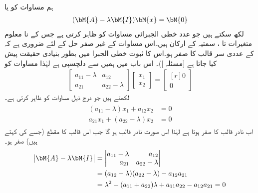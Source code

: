 ہم مساوات  کو  یا 
\begin{align}\label{مساوات_نظام_امتیازی_ب}
(\bM{A}-\lambda \bM{I})\bM{x}=\bM{0}
\end{align}
لکھ سکتے ہیں جو  عدد خطی الجبرائی مساوات کو ظاہر کرتی ہے جس کے نا معلوم متغیرات  تا ، سمتیہ  کے ارکان ہیں۔اس مساوات کے غیر صفر حل  کے لئے ضروری ہے کہ  کے عددی سر قالب کا  صفر ہو۔اس کا ثبوت  خطی الجبرا میں بطور بنیادی حقیقت پیش کیا جاتا ہے [مسئلہ ])۔ اس باب میں ہمیں   سے دلچسپی ہے لہٰذا مساوات  کو
\begin{align}\label{مساوات_نظام_امتیازی_پ}
\begin{bmatrix*}
a_{11}-\lambda& a_{12}\\
a_{21}& a_{22}-\lambda
\end{bmatrix*}
\begin{bmatrix*}
x_1\\
x_2
\end{bmatrix*}=
\begin{bmatrix*}[r]
0\\
0
\end{bmatrix*}
\end{align}
لکھتے ہیں جو درج ذیل مساوات کو ظاہر کرتی ہے۔
\begin{gather}\label{مساوات_نظام_امتیازی_ت}
\begin{aligned}
(a_{11}-\lambda)x_1+a_{12}x_2&=0\\
a_{21}x_1+(a_{22}-\lambda)x_2&=0
\end{aligned}
\end{gather}
اب نادر قالب کا  صفر ہوتا ہے لہٰذا   اس صورت نادر قالب ہو گا جب اس قالب کا مقطع (جسے  کی  کہتے ہیں) صفر ہو۔
\begin{gather}\label{مساوات_نظام_امتیازی_ٹ}
\begin{aligned}
\abs{\bM{A}-\lambda \bM{I}}&=
\begin{vmatrix*}[r]
a_{11}-\lambda& a_{12}\\
a_{21}& a_{22}-\lambda
\end{vmatrix*}\\
&=(a_{12}-\lambda)(a_{22}-\lambda)-a_{12}a_{21}\\
&=\lambda^2-(a_{11}+a_{22})\lambda+a_{11}a_{22}-a_{12}a_{21}=0
\end{aligned}
\end{gather}
